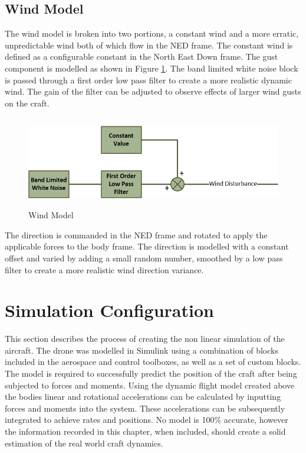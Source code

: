	\subsection{Wind Model}
	The wind model is broken into two portions, a constant wind and a more erratic, unpredictable wind both of which flow in the NED frame. The constant wind is defined as a configurable constant in the North East Down frame. The gust component is modelled as shown in Figure \ref{IM_WindModel}. The band limited white noise block is passed through a first order low pass filter to create a more realistic dynamic wind. The gain of the filter can be adjusted to observe effects of larger wind gusts on the craft.
	
	\begin{figure}[H]
		\centering
		\includegraphics[height = 4cm]{../References/Diagrams/WindModel.jpg}     
		\caption{Wind Model}
		\label{IM_WindModel}
	\end{figure}
	
	The direction is commanded in the NED frame and rotated to apply the applicable forces to the body frame. The direction is modelled with a constant offset and varied by adding a small random number, smoothed by a low pass filter to create a more realistic wind direction variance.
			
\section{Simulation Configuration}\label{SECT_Nonlinear}
This section describes the process of creating the non linear simulation of the aircraft. The drone was modelled in Simulink using a combination of blocks included in the aerospace and control toolboxes, as well as a set of custom blocks. The model is required to successfully predict the position of the craft after being subjected to forces and moments. Using the dynamic flight model created above the bodies linear and rotational accelerations can be calculated by inputting forces and moments into the system. These accelerations can be subsequently integrated to achieve rates and positions. No model is 100\% accurate, however the information recorded in this chapter, when included, should create a solid estimation of the real world craft dynamics.


